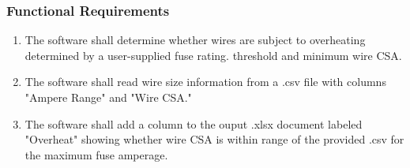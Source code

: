 \subsubsection{Functional Requirements}
\begin{enumerate}

\item The software shall determine whether wires are subject to overheating determined by a user-supplied fuse rating. threshold and minimum wire CSA.

\item The software shall read wire size information from a .csv file with columns "Ampere Range" and "Wire CSA."

\item The software shall add a column to the ouput .xlsx document labeled "Overheat" showing whether wire CSA is within range of the provided .csv for the maximum fuse amperage.

\end{enumerate}

 
